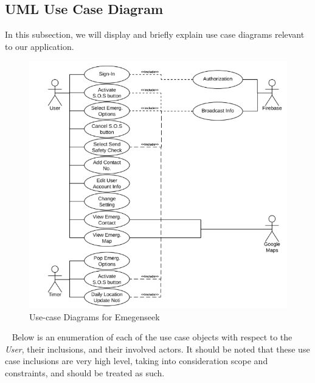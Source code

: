 \documentclass[10pt, a4paper]{article}
\begin{document}
\subsection{UML Use Case Diagram}
In this subsection, we will display and briefly explain use case diagrams relevant to our application.
\begin{figure}[H]
  \centerline{
  	\includegraphics[scale=.8]{diagrams/use-case.png}
  }  
  \caption{Use-case Diagrams for Emegenseek}
\end{figure}

\par ~ Below is an enumeration of each of the use case objects with respect to the \emph{User}, their inclusions, and their involved actors. It should be noted that these use case inclusions are very high level, taking into consideration scope and constraints, and should be treated as such.
\end{document}
